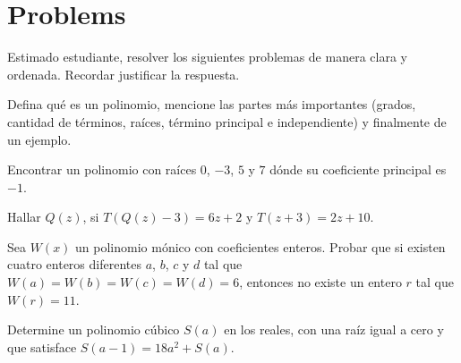 \section*{Problems}

Estimado estudiante, resolver los siguientes problemas de manera clara y ordenada.
Recordar justificar la respuesta.
\\
\hline

\begin{prob}
    Defina qué es un polinomio, mencione las partes más importantes (grados, cantidad de términos, raíces, término principal e independiente) y finalmente de un ejemplo.
\end{prob}

\begin{prob}
    Encontrar un polinomio con raíces $0$, $-3$, $5$ y $7$ dónde su coeficiente principal es $-1$.
\end{prob}

\begin{prob}
    Hallar $Q(z)$, si $T\left(Q(z) - 3\right) = 6z + 2$ y $T(z + 3) = 2z + 10$.
\end{prob}

\begin{prob}
    Sea $W(x)$ un polinomio mónico con coeficientes enteros.
    Probar que si existen cuatro enteros diferentes $a$, $b$, $c$ y $d$ tal que $W(a) = W(b) = W(c) = W(d) = 6$,
    entonces no existe un entero $r$ tal que $W(r) = 11$.
\end{prob}

\begin{prob}
    Determine un polinomio cúbico $S(a)$ en los reales, con una raíz igual a cero y que satisface $S(a - 1) = 18a^2 + S(a)$.
\end{prob}

\hline